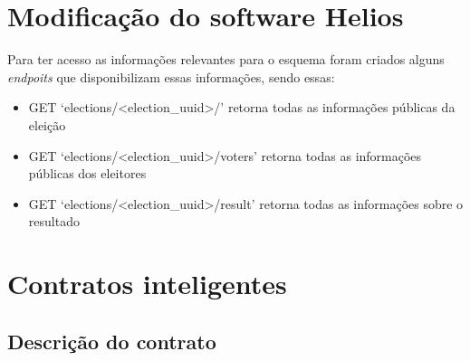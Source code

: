 \documentclass{ufsctex/ufsctex}
\begin{document}
\section{Modificação do software Helios}
Para ter acesso as informações relevantes para o esquema foram criados alguns
\textit{endpoits} que disponibilizam essas informações, sendo essas:

\begin{itemize}
	\item GET `elections/<election\_uuid>/' retorna todas as informações públicas da eleição
	\item GET `elections/<election\_uuid>/voters' retorna todas as informações públicas dos eleitores
	\item GET `elections/<election\_uuid>/result' retorna todas as informações sobre o resultado
\end{itemize}

\section{Contratos inteligentes}

\subsection{Descrição do contrato}
\end{document}
